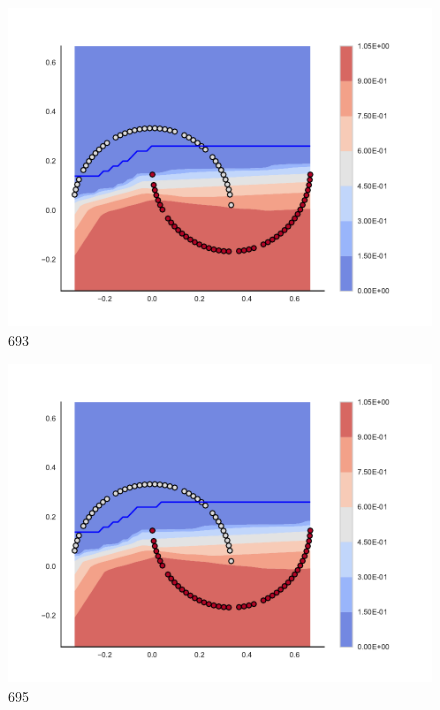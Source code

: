 \begin{subfigure}[b]{0.09\textwidth}
    \includegraphics[clip, trim=2.35cm 1.75cm 4.5cm 0cm,width=\textwidth]{img/convergence/693.pdf}
    \caption{693}
    \label{fig:convergence_693}
\end{subfigure}
%
\begin{subfigure}[b]{0.09\textwidth}
    \includegraphics[clip, trim=2.35cm 1.75cm 4.5cm 0cm,width=\textwidth]{img/convergence/695.pdf}
    \caption{695}
    \label{fig:convergence_695}
\end{subfigure}
%
